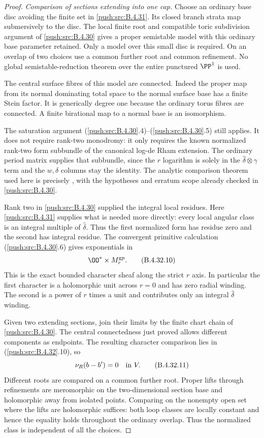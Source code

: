 \begin{proof}
\emph{Comparison of sections extending into one cap.}
Choose an ordinary base disc avoiding the finite set in
\ref{push:src:B.4.31}. Its closed branch strata map submersively to the
disc. The local finite root and compatible toric subdivision
argument of \ref{push:src:B.4.30} gives a proper semistable model with this
ordinary base parameter retained. Only a model over this
small disc is required. On an overlap of two choices use a
common further root and common refinement. No global
semistable-reduction theorem over the entire punctured
$\PP^1$ is used.

The central surface fibres of this model are connected.
Indeed the proper map from its normal dominating total space
to the normal surface base has a finite Stein factor.
It is generically degree one because the ordinary torus
fibres are connected. A finite birational map to a normal
base is an isomorphism.

The saturation argument (\ref{push:src:B.4.30}.4)--(\ref{push:src:B.4.30}.5) still applies.
It does not require rank-two monodromy: it only requires the
known normalized rank-two form subbundle of the canonical
log-de Rham extension. The ordinary period matrix supplies
that subbundle, since the $r$ logarithm is solely in the
$\widehat\delta\otimes\gamma$ term and the $w,\delta$
columns stay the identity. The analytic comparison theorem
used here is precisely
\citet[Theorem 6.3]{IKN2005E}, with the hypotheses and erratum
scope already checked in \ref{push:src:B.4.30}.

Rank two in \ref{push:src:B.4.30} supplied the integral local residues.
Here \ref{push:src:B.4.31} supplies what is needed more directly: every
local angular class is an integral multiple of
$\widehat\delta$. Thus the first normalized form has residue
zero and the second has integral residue. The convergent
primitive calculation (\ref{push:src:B.4.30}.6) gives exponentials in
\[
              \OO^*\times M_r^{\rm gp}.
 \tag{B.4.32.10}
\]
This is the exact bounded character sheaf along the strict
$r$ axis. In particular the first character is a holomorphic
unit across $r=0$ and has zero radial winding. The second
is a power of $r$ times a unit and contributes only an
integral $\widehat\delta$ winding.

Given two extending sections, join their limits by the finite
chart chain of \ref{push:src:B.4.30}. The central connectedness just proved
allows different components as endpoints. The resulting
character comparison lies in (\ref{push:src:B.4.32}.10), so
\[
               \nu_R(b-b')=0\quad\hbox{in }V.
 \tag{B.4.32.11}
\]
Different roots are compared on a common further root.
Proper lifts through refinements are meromorphic on the
two-dimensional section base and holomorphic away from
isolated points. Comparing on the nonempty open set where
the lifts are holomorphic suffices: both loop classes are
locally constant and hence the equality holds throughout
the ordinary overlap. Thus the normalized class is
independent of all the choices.


\end{proof}
